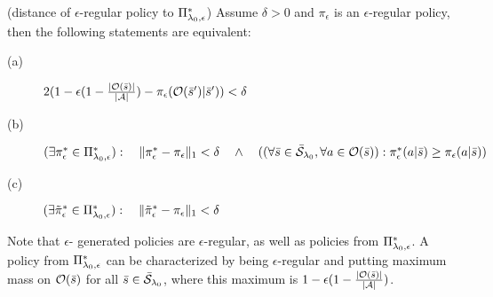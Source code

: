 \begin{remark}
\label{re:epsreg}
(distance of $\epsilon$-regular policy to $\Pi_{\mathit{\lambda}_0,\epsilon}^*$)
Assume $\delta > 0$ and $\pi_{\epsilon}$ is an
$\epsilon$-regular policy, then the following statements are equivalent:
\begin{description}
    \item[(a)] 
    $2(1-\epsilon(1-\frac{|\mathcal{O}(\bar{s})|}{|\mathcal{A}|})-\pi_{\epsilon}(\mathcal{O}(\bar{s}')|\bar{s}')) < \delta$
    \item[(b)] 
$
(\exists \pi_{\epsilon}^{*} \in \Pi_{\mathit{\lambda}_0,\epsilon}^{*} ):
\quad
\|\pi_{\epsilon}^* - \pi_{\epsilon}\|_1 < \delta
\quad
\wedge
\quad
(
(\forall \bar{s}\in \bar{\mathcal{S}}_{\mathit{\lambda}_0}, \forall a \in \mathcal{O}(\bar{s})):
\pi_{\epsilon}^{*}(a|\bar{s}) \geq \pi_{\epsilon}(a|\bar{s})
)
$
    \item[(c)] 
$
(\exists \tilde{\pi}_{\epsilon}^{*} \in \Pi_{\mathit{\lambda}_0,\epsilon}^{*} ):
\quad
\|\tilde{\pi}_{\epsilon}^* - \pi_{\epsilon}\|_1 < \delta
$
\end{description}
\end{remark}
Note that $\epsilon$-\eUDRL{} generated policies are $\epsilon$-regular, as well as policies from $\Pi_{\mathit{\lambda}_0,\epsilon}^*$.
A policy from $\Pi_{\mathit{\lambda}_0,\epsilon}^*$ can be characterized by
being $\epsilon$-regular and putting maximum mass on $\mathcal{O}(\bar{s})$
for all $\bar{s}\in \bar{\mathcal{S}}_{\mathit{\lambda}_0}$, where this 
maximum is $1-\epsilon(1-\frac{|\mathcal{O}(\bar{s})|}{|\mathcal{A}|})$.
